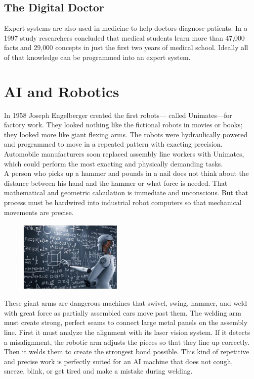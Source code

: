 \documentclass[12pt]{article}
\begin{document}
 \subsection{The Digital Doctor}
 \large
  Expert systems are also used in medicine to help doctors diagnose patients. In a 1997 study researchers concluded that medical students learn more than 47,000 facts and 29,000 concepts in just the first two years of medical school. Ideally all of that knowledge can be programmed into an expert system.\\
\newpage
\Huge

\section{\textbf{AI and Robotics}}
\center
\large\flushleft 
In 1958 Joseph Engelberger created the first robots— called Unimates—for factory work. They looked nothing like the fictional robots in movies or books; they looked more like giant flexing arms. The robots were hydraulically powered and programmed to move in a repeated pattern with exacting precision. Automobile manufacturers soon replaced assembly line workers with Unimates, which could perform the most exacting and physically demanding tasks.\\
A person who picks up a hammer and pounds in a nail does not think about the distance between his hand and the hammer or what force is needed. That mathematical and geometric calculation is immediate and unconscious. But that process must be hardwired into industrial robot computers so that mechanical movements are precise.\\
\begin{figure}[h]
\center
  \includegraphics[width=5cm]{Image/IMG_20200125_232848.jpg}
  \caption{}
 \end{figure}
These giant arms are dangerous machines that swivel, swing, hammer, and weld with great force as partially assembled cars move past them. The welding arm must create strong, perfect seams to connect large metal panels on the assembly line. First it must analyze the alignment with its laser vision system. If it detects a misalignment, the robotic arm adjusts the pieces so that they line up correctly. Then it welds them to create the strongest bond possible. This kind of repetitive and precise work is perfectly suited for an AI machine that does not cough, sneeze, blink, or get tired and make a mistake during welding. \\
\huge
\end{document}
